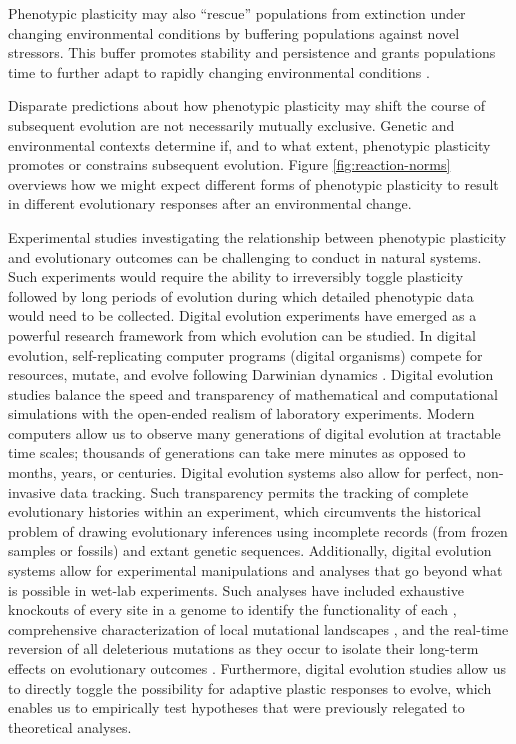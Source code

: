 Phenotypic plasticity may also ``rescue'' populations from extinction under changing environmental conditions by buffering populations against novel stressors.
This buffer promotes stability and persistence and grants populations time to further adapt to rapidly changing environmental conditions \citep{west-eberhard_developmental_2003,chevin_when_2010}. 

Disparate predictions about how phenotypic plasticity may shift the course of subsequent evolution are not necessarily mutually exclusive.
Genetic and environmental contexts determine if, and to what extent, phenotypic plasticity promotes or constrains subsequent evolution.
Figure \ref{fig:reaction-norms} overviews how we might expect different forms of phenotypic plasticity to result in different evolutionary responses after an environmental change.

Experimental studies investigating the relationship between phenotypic plasticity and evolutionary outcomes can be challenging to conduct in natural systems.
Such experiments would require the ability to irreversibly toggle plasticity followed by long periods of evolution during which detailed phenotypic data would need to be collected.
Digital evolution experiments have emerged as a powerful research framework from which evolution can be studied.
In digital evolution, self-replicating computer programs (digital organisms) compete for resources, mutate, and evolve following Darwinian dynamics  \citep{wilke_biology_2002}.
Digital evolution studies balance the speed and transparency of mathematical and computational simulations with the open-ended realism of laboratory experiments.
Modern computers allow us to observe many generations of digital evolution at tractable time scales; thousands of generations can take mere minutes as opposed to months, years, or centuries.
Digital evolution systems also allow for perfect, non-invasive data tracking.
Such transparency permits the tracking of complete evolutionary histories within an experiment, which circumvents the historical problem of drawing evolutionary inferences using incomplete records (from frozen samples or fossils) and extant genetic sequences.
Additionally, digital evolution systems allow for experimental manipulations and analyses that go beyond what is possible in wet-lab experiments.
Such analyses have included exhaustive knockouts of every site in a genome to identify the functionality of each \citep{lenski_evolutionary_2003},
comprehensive characterization of local mutational landscapes \citep{lenski_genome_1999,canino-koning_fluctuating_2019},
and the real-time reversion of all deleterious mutations as they occur to isolate their long-term effects on evolutionary outcomes \citep{covert_experiments_2013}. 
Furthermore, digital evolution studies allow us to directly toggle the possibility for adaptive plastic responses to evolve, which enables us to empirically test hypotheses that were previously relegated to theoretical analyses.

